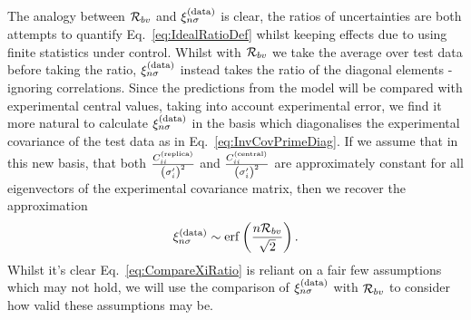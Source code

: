 The analogy between $\mathcal{R}_{bv}$ and $\xi^{(\rm data)}_{n \sigma}$ is clear, the ratios of
uncertainties are both attempts to quantify Eq.~\ref{eq:IdealRatioDef} whilst keeping
effects due to using finite statistics under control. Whilst with
$\mathcal{R}_{bv}$ we take the average over
test data before taking the ratio, $\xi^{(\rm data)}_{n \sigma}$ instead takes the ratio
of the diagonal elements - ignoring correlations. Since the predictions
from the model will be compared with experimental central values, taking into
account experimental error, we find it more natural to calculate $\xi^{(\rm data)}_{n \sigma}$
in the basis which diagonalises the experimental covariance of the test data as
in Eq.~\ref{eq:InvCovPrimeDiag}. If we assume that in this new basis, that
both $\frac{C^{(\rm replica)}_{ii}}{\left(\sigma'_i\right)^2}$ and
$\frac{C^{(\rm central)}_{ii}}{\left(\sigma'_i\right)^2}$ are approximately constant
for all eigenvectors of the experimental covariance matrix, then we recover the
approximation
\begin{equation}\label{eq:CompareXiRatio}
    \xi^{(\rm data)}_{n \sigma} \sim {\rm erf} \left( \frac{ n\mathcal{R}_{bv}}{\sqrt{2}} \right).
\end{equation}
Whilst it's clear Eq.~\ref{eq:CompareXiRatio} is reliant on a fair few
assumptions which may not hold, we will use the comparison of $\xi^{(\rm data)}_{n \sigma}$ with
$\mathcal{R}_{bv}$ to consider how valid these assumptions may be.
